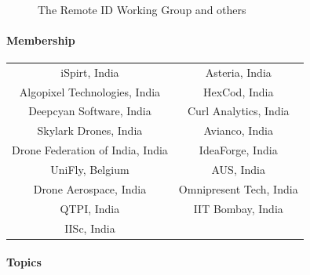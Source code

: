 \documentclass{ua_wgs_base}
\begin{document}
\begin{figure}[tbh]
\begin{centering}
\begin{center}
\small\tt
\hfil 
{}
\hfil \end{center}
\par\end{centering}
\caption{The Remote ID Working Group and others}
\end{figure}


\paragraph*{Membership}
\begin{center}
\begin{tabular}{|c|c|}
\hline 
iSpirt, India & Asteria, India\tabularnewline
Algopixel Technologies, India\footnotemark & HexCod, India\tabularnewline
Deepcyan Software, India\footnotemark[\value{footnote}] & Curl Analytics, India\tabularnewline
Skylark Drones, India\footnotemark[\value{footnote}] & Avianco, India\footnotemark[\value{footnote}]\tabularnewline
Drone Federation of India, India\footnotemark[\value{footnote}] & IdeaForge, India\tabularnewline
UniFly, Belgium\footnotemark[\value{footnote}] & AUS, India\tabularnewline
Drone Aerospace, India & Omnipresent Tech, India\tabularnewline
QTPI, India & IIT Bombay, India\tabularnewline
IISc, India & \tabularnewline
\hline 
\end{tabular}
\par\end{center}

\begin{center}
\par\end{center}

\paragraph*{Topics}
\end{document}
